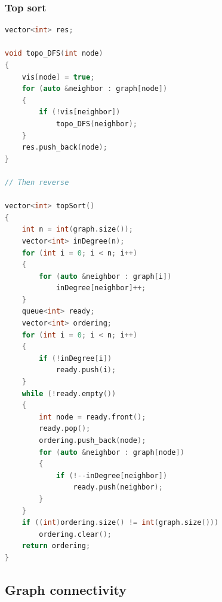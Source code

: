 \documentclass[10pt,landscape,a4paper,twocolumn]{article}
\begin{document}
\subsubsection{Top sort}
\begin{lstlisting}[language=C++]
vector<int> res;

void topo_DFS(int node)
{
    vis[node] = true;
    for (auto &neighbor : graph[node])
    {
        if (!vis[neighbor])
            topo_DFS(neighbor);
    }
    res.push_back(node);
}

// Then reverse

vector<int> topSort()
{
    int n = int(graph.size());
    vector<int> inDegree(n);
    for (int i = 0; i < n; i++)
    {
        for (auto &neighbor : graph[i])
            inDegree[neighbor]++;
    }
    queue<int> ready;
    vector<int> ordering;
    for (int i = 0; i < n; i++)
    {
        if (!inDegree[i])
            ready.push(i);
    }
    while (!ready.empty())
    {
        int node = ready.front();
        ready.pop();
        ordering.push_back(node);
        for (auto &neighbor : graph[node])
        {
            if (!--inDegree[neighbor])
                ready.push(neighbor);
        }
    }
    if ((int)ordering.size() != int(graph.size()))
        ordering.clear();
    return ordering;
}

\end{lstlisting}
\subsection{Graph connectivity}
\end{document}
